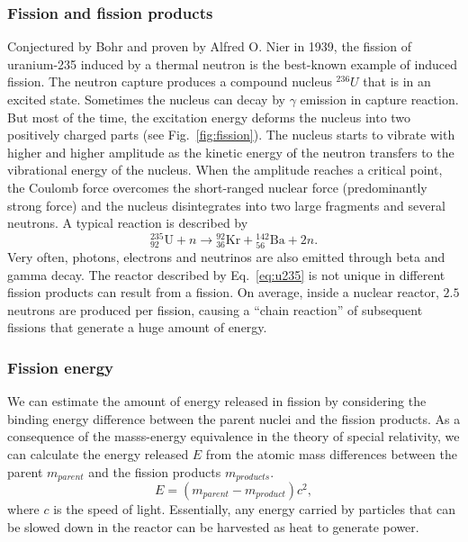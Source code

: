 \documentclass[nofootinbib,preprint,aps]{revtex4-1}
\begin{document}
        \subsubsection{Fission and fission products}
        \label{sec:fission}
        Conjectured by Bohr and proven by Alfred O. Nier in 1939,
        the fission of uranium-235 induced by a thermal neutron
        is the best-known example of induced fission. 
        The neutron capture produces a compound nucleus ${}^{236}U$ that is in an excited state.
        Sometimes the nucleus can decay by $\gamma$ emission in capture reaction.
        But most of the time, the excitation energy deforms the nucleus into two positively charged
        parts (see Fig.~\ref{fig:fission}).
        The nucleus starts to vibrate with higher and higher amplitude as the kinetic energy of the
        neutron transfers to the vibrational energy of the nucleus.
        When the
        amplitude reaches a critical point, the Coulomb force overcomes the short-ranged nuclear
        force (predominantly strong force) and the nucleus disintegrates into two large fragments and several neutrons.
        A typical reaction is described by
        \begin{equation}
        {}^{235}_{92}\text{U} + n \rightarrow {}^{92}_{36}\text{Kr} + {}^{142}_{56}\text{Ba} + 2 n.
        \label{eq:u235}
        \end{equation}
        Very often, photons, electrons and neutrinos are also emitted through beta and gamma decay.
        The reactor described by Eq.~\ref{eq:u235} is not unique in different fission products can result
        from a fission.
        On average, inside a nuclear reactor, $2.5$ neutrons are produced per fission, causing a ``chain reaction'' of subsequent
        fissions that generate a huge amount of energy.\cite[chapt. 10]{l01}

        \subsubsection{Fission energy}
        We can estimate the amount of energy released in fission by considering the binding energy difference
        between the parent nuclei and the fission products. As a consequence of the masss-energy equivalence in the theory
        of special relativity, we can calculate the energy released $E$ from the atomic mass differences between the parent $m_{parent}$
        and the fission products $m_{products}$.
        \begin{equation}
            E = (m_{parent}-m_{product})c^2,
        \end{equation}
        where $c$ is the speed of light.
        Essentially, any energy carried by particles that can be slowed down 
        in the reactor can be harvested as heat to generate power.
\end{document}
